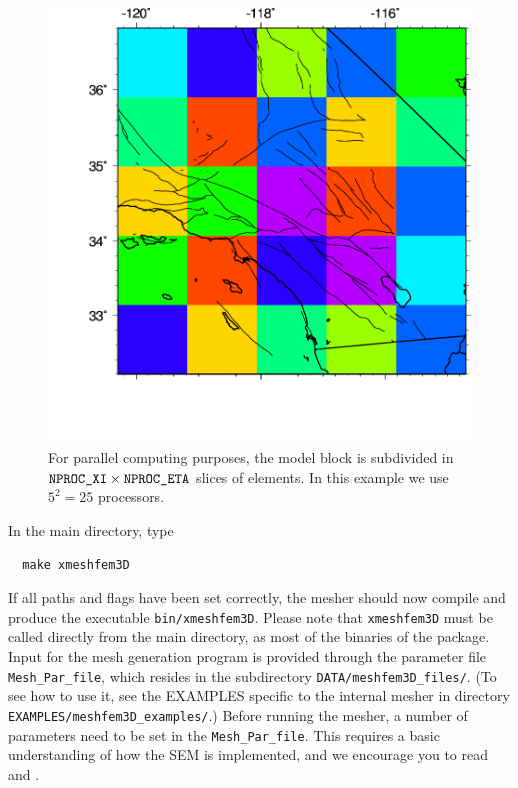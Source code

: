 \begin{figure}[htbp]
\begin{centering}
\includegraphics[scale=0.5]{figures/socal_map_mpi.pdf}
\par
\end{centering}
\caption{For parallel computing purposes,
the model block is subdivided in $\mbox{\texttt{NPROC\_XI\/}}\times\mbox{\texttt{NPROC\_ETA\/}}$ slices
of elements. In this example we use $5^{2}=25$ processors. }
\label{fig:For-parallel-computing}
\end{figure}


\noindent
In the main directory, type
{\small
\begin{verbatim}
  make xmeshfem3D
\end{verbatim}
}
\noindent
If all paths and flags have been set correctly, the mesher should
now compile and produce the executable \texttt{bin/xmeshfem3D}. Please
note that \texttt{xmeshfem3D} must be called directly from the main
directory, as most of the binaries of the package.\\


Input for the mesh generation program is provided through the parameter
file \texttt{Mesh\_Par\_file}, which resides in the subdirectory \texttt{DATA/meshfem3D\_files/}.
(To see how to use it, see the EXAMPLES specific to the internal mesher in directory \texttt{EXAMPLES/meshfem3D\_examples/}.)
Before running the mesher, a number of parameters need to be set in
the \texttt{Mesh\_Par\_file}. This requires a basic understanding
of how the SEM is implemented, and we encourage you to read \citet{KoVi98,KoTr99}
and \citet{KoLiTrSuStSh04}.\\


